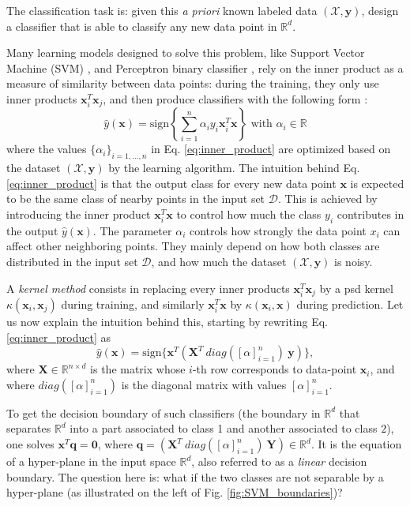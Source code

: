 The classification task is: given this \emph{a priori} known labeled data $(\mathcal{X},\mathbf{y})$, design a classifier that is able to classify any new data point in $\mathbb{R}^d$. 

Many learning models designed to solve this problem, like Support Vector Machine (SVM) \citep{svm_tut}, and Perceptron binary classifier \citep{perceptron_tut}, rely on the inner product as a measure of similarity between data points: during the training, they only use inner products $\mathbf{x}_i^T \mathbf{x}_j$, and then produce classifiers with the following form \citep{inner_product}:
\begin{equation}
\label{eq:inner_product}
\hat{y}(\mathbf{x})=\text{sign}\left\{\sum_{i=1}^n\alpha_iy_i\mathbf{x}_i^T\mathbf{x}\right\} \text{ with } \alpha_i\in \mathbb{R}
\end{equation}
where the values $\{\alpha_i\}_{i=1,\ldots,n}$ in Eq. \ref{eq:inner_product} are optimized based on the dataset $(\mathcal{X},\mathbf{y})$ by the learning algorithm. The intuition behind Eq. \ref{eq:inner_product} is that the output class for every new data point $\mathbf{x}$ is expected to be the same class of nearby points in the input set $\mathcal{D}$. This is achieved by introducing the inner product $\mathbf{x}_i^T\mathbf{x}$ to control how much the class $y_i$ contributes in the output $\hat{y}(\mathbf{x})$. The parameter $\alpha_i$ controls how strongly the data point $x_i$ can affect other neighboring points. They mainly depend on how both classes are distributed in the input set $\mathcal{D}$, and  how much the dataset $(\mathcal{X},\mathbf{y})$ is noisy. 



A \emph{kernel method} consists in replacing every inner products $\mathbf{x}_i^T \mathbf{x}_j$ by a psd kernel $\kappa(\mathbf{x}_i, \mathbf{x}_j)$ during training, and similarly $\mathbf{x}_i^T\mathbf{x}$ by $\kappa(\mathbf{x}_i, \mathbf{x})$ during prediction.
Let us now explain the intuition behind this, starting by rewriting Eq. \ref{eq:inner_product} as 
\[
\hat{y}(\mathbf{x})=\text{sign}\{\textbf{x}^T(\mathbf{X}^T~diag([\alpha]_{i=1}^n)~\mathbf{y})\},
\]
where $\mathbf{X}\in\mathbb{R}^{n\times d}$ is the matrix whose $i$-th row corresponds to data-point $\mathbf{x}_i$, and where $diag([\alpha]_{i=1}^n)$ is the diagonal matrix with values $[\alpha]_{i=1}^n$. 

To get the decision boundary of such classifiers (the boundary in $\mathbb{R}^d$ that separates $\mathbb{R}^d$ into a part associated to class 1 and another associated to class $2$), one solves $\mathbf{x}^T\mathbf{q}=\mathbf{0}$, where $\textbf{q}=(\mathbf{X}^T~diag([\alpha]_{i=1}^n)~\mathbf{Y})\in\mathbb{R}^d$. It is the equation of a hyper-plane in the input space $\mathbb{R}^d$, also referred to as a \emph{linear} decision boundary. 
The question here is: what if the two classes are not separable by a hyper-plane (as illustrated on the left of Fig. \ref{fig:SVM_boundaries})? 

